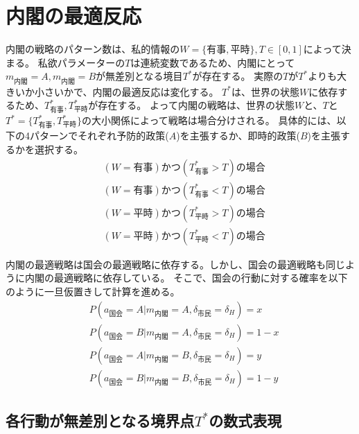 \documentclass[main.tex]{subfiles}
\begin{document}
\section{内閣の最適反応}



内閣の戦略のパターン数は、私的情報の$W=\lbrace 有事, 平時\rbrace, T\in[0,1]$によって決まる。
私欲パラメーターの$T$は連続変数であるため、内閣にとって$m_{内閣}=A,m_{内閣}=B$が無差別となる境目$T^*$が存在する。
実際の$T$が$T^*$よりも大きいか小さいかで、内閣の最適反応は変化する。
$T^*$は、世界の状態$W$に依存するため、$T^*_{有事}, T^*_{平時}$が存在する。
よって内閣の戦略は、世界の状態$W$と、$T$と$T^* = \lbrace T^*_{有事}, T^*_{平時} \rbrace$の大小関係によって戦略は場合分けされる。
具体的には、以下の4パターンでそれぞれ予防的政策($A$)を主張するか、即時的政策($B$)を主張するかを選択する。
\begin{align*}
    & (W=有事) かつ (T^*_{有事}>T) の場合 \\
    & (W=有事) かつ (T^*_{有事}<T) の場合 \\
    & (W=平時) かつ (T^*_{平時}>T) の場合 \\
    & (W=平時) かつ (T^*_{平時}<T) の場合 
\end{align*}


内閣の最適戦略は国会の最適戦略に依存する。しかし、国会の最適戦略も同じように内閣の最適戦略に依存している。
そこで、国会の行動に対する確率を以下のように一旦仮置きして計算を進める。
\begin{align*}
    & P(a_{国会} = A| m_{内閣} = A, \delta_{市民} = \delta_H ) = x \\
    & P(a_{国会} = B| m_{内閣} = A, \delta_{市民} = \delta_H ) = 1-x \\
    & P(a_{国会} = A| m_{内閣} = B, \delta_{市民} = \delta_H ) = y \\
    & P(a_{国会} = B| m_{内閣} = B, \delta_{市民} = \delta_H ) = 1-y
\end{align*}






\subsection{各行動が無差別となる境界点$T^*$の数式表現}
\end{document}
